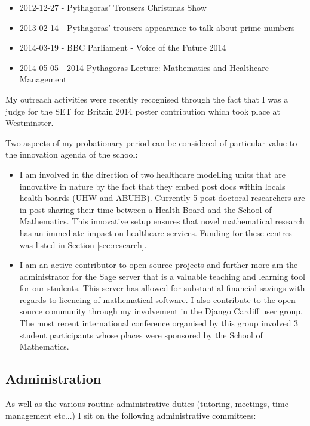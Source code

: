 \documentclass{article}
\begin{document}
\begin{itemize}
    \item 2012-12-27 - Pythagoras' Trousers Christmas Show
    \item 2013-02-14 - Pythagoras' trousers appearance to talk about prime numbers
    \item 2014-03-19 - BBC Parliament - Voice of the Future 2014
    \item 2014-05-05 - 2014 Pythagoras Lecture: Mathematics and Healthcare Management
\end{itemize}

My outreach activities were recently recognised through the fact that I was a judge for the SET for Britain 2014 poster contribution which took place at Westminster.

Two aspects of my probationary period can be considered of particular value to the innovation agenda of the school:

\begin{itemize}
    \item I am involved in the direction of two healthcare modelling units that are innovative in nature by the fact that they embed post docs within locals health boards (UHW and ABUHB).
          Currently 5 post doctoral researchers are in post sharing their time between a Health Board and the School of Mathematics.
          This innovative setup ensures that novel mathematical research has an immediate impact on healthcare services.
          Funding for these centres was listed in Section \ref{sec:research}.
    \item I am an active contributor to open source projects and further more am the administrator for the Sage server that is a valuable teaching and learning tool for our students.
          This server has allowed for substantial financial savings with regards to licencing of mathematical software.
          I also contribute to the open source community through my involvement in the Django Cardiff user group.
          The most recent international conference organised by this group involved 3 student participants whose places were sponsored by the School of Mathematics.
\end{itemize}

\subsection{Administration}

As well as the various routine administrative duties (tutoring, meetings, time management etc...) I sit on the following administrative committees:
\end{document}
